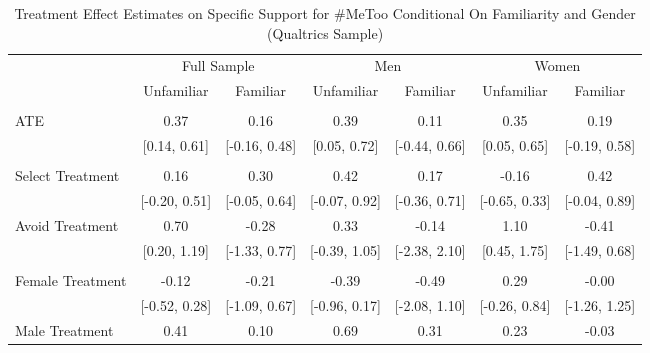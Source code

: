 \documentclass[
]{article}
\begin{document}
\begin{table}[H]

\caption{\label{tab:tabF2}Treatment Effect Estimates on Specific Support for \#MeToo Conditional On Familiarity and Gender (Qualtrics Sample)}
\centering
\begin{threeparttable}
\begin{tabular}[t]{lcccccc}
\toprule
\multicolumn{1}{c}{ } & \multicolumn{2}{c}{Full Sample} & \multicolumn{2}{c}{Men} & \multicolumn{2}{c}{Women} \\
\cmidrule(l{3pt}r{3pt}){2-3} \cmidrule(l{3pt}r{3pt}){4-5} \cmidrule(l{3pt}r{3pt}){6-7}
  & Unfamiliar & Familiar & Unfamiliar & Familiar & Unfamiliar & Familiar\\
\midrule
\addlinespace[0.3em]
\multicolumn{7}{l}{\textbf{ATE}}\\
\hspace{1em}ATE & 0.37 & 0.16 & 0.39 & 0.11 & 0.35 & 0.19\\
\hspace{1em} & {}[0.14, 0.61] & {}[-0.16, 0.48] & {}[0.05, 0.72] & {}[-0.44, 0.66] & {}[0.05, 0.65] & {}[-0.19, 0.58]\\
\addlinespace[0.3em]
\multicolumn{7}{l}{\textbf{ACTE}}\\
\hspace{1em}Select Treatment & 0.16 & 0.30 & 0.42 & 0.17 & -0.16 & 0.42\\
\hspace{1em} & {}[-0.20, 0.51] & {}[-0.05, 0.64] & {}[-0.07, 0.92] & {}[-0.36, 0.71] & {}[-0.65, 0.33] & {}[-0.04, 0.89]\\
\hspace{1em}Avoid Treatment & 0.70 & -0.28 & 0.33 & -0.14 & 1.10 & -0.41\\
\hspace{1em} & {}[0.20, 1.19] & {}[-1.33, 0.77] & {}[-0.39, 1.05] & {}[-2.38, 2.10] & {}[0.45, 1.75] & {}[-1.49, 0.68]\\
\addlinespace[0.3em]
\multicolumn{7}{l}{\textbf{CACTE}}\\
\hspace{1em}Female Treatment & -0.12 & -0.21 & -0.39 & -0.49 & 0.29 & -0.00\\
\hspace{1em} & {}[-0.52, 0.28] & {}[-1.09, 0.67] & {}[-0.96, 0.17] & {}[-2.08, 1.10] & {}[-0.26, 0.84] & {}[-1.26, 1.25]\\
\hspace{1em}Male Treatment & 0.41 & 0.10 & 0.69 & 0.31 & 0.23 & -0.03\\

\end{tabular}
\end{threeparttable}
\end{table}
\end{document}
